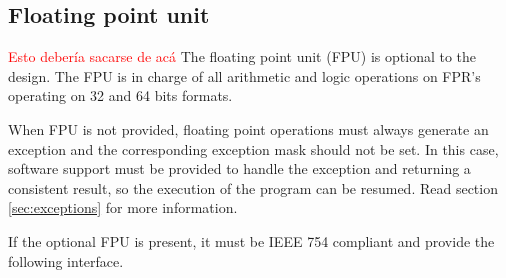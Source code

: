 \subsection{Floating point unit}
\textcolor{red}{Esto debería sacarse de acá}
The floating point unit (FPU) is optional to the design. The FPU is in charge of all arithmetic and logic operations on FPR's
operating on 32 and 64 bits formats.

When FPU is not provided, floating point operations must always generate
an exception and the corresponding exception mask should not be set. In this case, software support must be provided to handle the
exception and returning a consistent result, so the execution of the program can be resumed. Read section \ref{sec:exceptions} for more
information.

If the optional FPU is present, it must be IEEE 754 compliant and provide the following interface.

